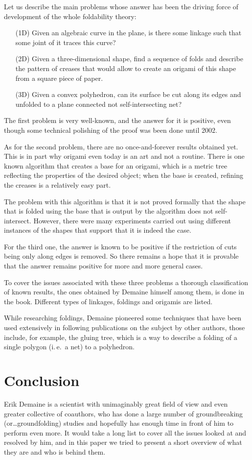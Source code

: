 \documentclass[a4paper,12pt]{article}
\begin{document}
Let us describe the main problems whose answer has been the driving force of development of the whole foldability theory: \begin{enumerate}
	\item[(1D)] Given an algebraic curve in the plane, is there some linkage such that some joint of it traces this curve?
	\item[(2D)] Given a three-dimensional shape, find a sequence of folds and describe the pattern of creases that would allow to create an origami of this shape from a square piece of paper.
	\item[(3D)] Given a convex polyhedron, can its surface be cut along its edges and unfolded to a plane connected not self-intersecting net?
\end{enumerate}

The first problem is very well-known, and the answer for it is positive, even though some technical polishing of the proof was been done until 2002.

As for the second problem, there are no once-and-forever results obtained yet. This is in part why origami even today is an art and not a routine. There is one known algorithm that creates a base for an origami, which is a metric tree reflecting the properties of the desired object; when the base is created, refining the creases is a relatively easy part.

The problem with this algorithm is that it is not proved formally that the shape that is folded using the base that is output by the algorithm does not self-intersect. However, there were many experiments carried out using different instances of the shapes that support that it is indeed the case.

For the third one, the answer is known to be positive if the restriction of cuts being only along edges is removed. So there remains a hope that it is provable that the answer remains positive for more and more general cases.

To cover the issues associated with these three problems a thorough classification of known results, the ones obtained by Demaine himself among them, is done in the book. Different types of linkages, foldings and origamis are listed.

While researching foldings, Demaine pioneered some techniques that have been used extensively in following publications on the subject by other authors, those include, for example, the gluing tree, which is a way to describe a folding of a single polygon (i.\,e.~a net) to a polyhedron.

\section{Conclusion}

Erik Demaine is a scientist with unimaginably great field of view and even greater collective of coauthors, who has done a large number of groundbreaking (or\ldots groundfolding) studies and hopefully has enough time in front of him to perform even more. It would take a long list to cover all the issues looked at and resolved by him, and in this paper we tried to present a short overview of what they are and who is behind them. \newpage
\end{document}
